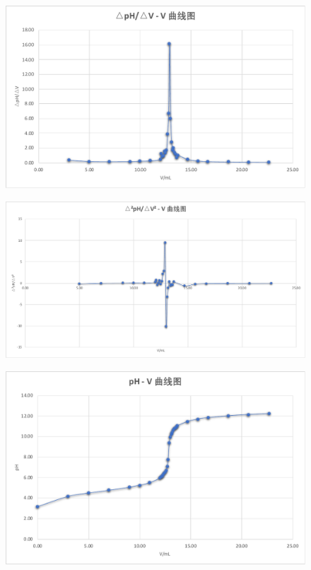 \documentclass[UTF8,AutoFakeBold]{ctexbook}
\begin{document}
\begin{figure}[h]
 	\centering
	\includegraphics[scale=0.7]{一阶微商图}
 \end{figure}
 \begin{figure}[h]
 	\centering
	\includegraphics[scale=0.7]{二阶微商图}
 \end{figure}
 \begin{figure}[h]
 	\centering
	\includegraphics[scale=0.7]{曲线图}
 \end{figure}
\end{document}
